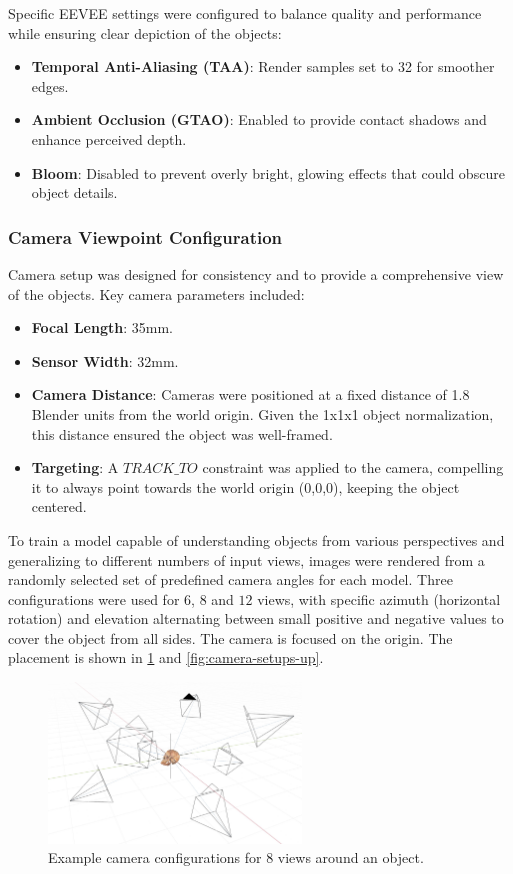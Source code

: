 Specific EEVEE settings were configured to balance quality and performance while ensuring clear depiction of the objects:
\begin{itemize}
  \item \textbf{Temporal Anti-Aliasing (TAA)}: Render samples set to 32 for smoother edges.
  \item \textbf{Ambient Occlusion (GTAO)}: Enabled to provide contact shadows and enhance perceived depth.
  \item \textbf{Bloom}: Disabled to prevent overly bright, glowing effects that could obscure object details.
\end{itemize}

\subsubsection{Camera Viewpoint Configuration}\label{sssec:camera-config}
Camera setup was designed for consistency and to provide a comprehensive view of the objects.
Key camera parameters included:
\begin{itemize}
  \item \textbf{Focal Length}: 35mm.
  \item \textbf{Sensor Width}: 32mm.
  \item \textbf{Camera Distance}: Cameras were positioned at a fixed distance of 1.8 Blender units from the world origin. Given the 1x1x1 object normalization, this distance ensured the object was well-framed.
  \item \textbf{Targeting}: A $TRACK\_TO$ constraint was applied to the camera, compelling it to always point towards the world origin (0,0,0), keeping the object centered.
\end{itemize}

To train a model capable of understanding objects from various perspectives and generalizing to different numbers of input views, images were rendered from a randomly selected set of predefined camera angles for each model. Three configurations were used for $6$, $8$ and $12$ views, with specific azimuth (horizontal rotation) and elevation alternating between small positive and negative values to cover the object from all sides. The camera is focused on the origin. The placement is shown in \ref{fig:camera-setups} and \ref{fig:camera-setups-up}.

\begin{figure}[h]
  \centering
  \includegraphics[width=0.6\textwidth]{images/data/rendering-ortho.jpeg}
  \caption{Example camera configurations for 8 views around an object.}
  \label{fig:camera-setups}
\end{figure}

